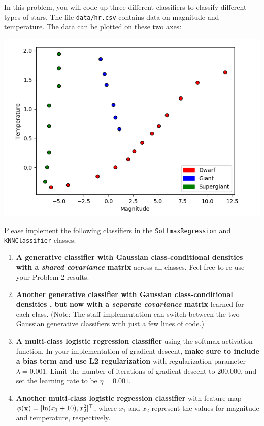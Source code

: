 \documentclass[submit]{harvardml}
\begin{document}
\begin{problem}
In this problem, you will code up three different classifiers to classify different types of stars. The file \verb|data/hr.csv| contains data on magnitude and temperature. The data can be plotted on these two axes:
\begin{center}
\includegraphics[width=.5\textwidth]{images/star.png}
\end{center}

Please implement the following classifiers in the \verb|SoftmaxRegression| and \verb|KNNClassifier| classes:

\begin{enumerate}[label=\alph*)]

\item \textbf{A generative classifier with Gaussian class-conditional
  densities with a \textit{shared covariance} matrix} across all classes. 
  Feel free to re-use your Problem 2 results.

\item \textbf{Another generative classifier with Gaussian class-conditional densities , but now 
with a \textit{separate covariance} matrix} learned for each class. (Note: 
The staff implementation can switch between the two Gaussian generative classifiers with just a
few lines of code.)

\item \textbf{A multi-class logistic regression classifier} using the softmax activation function. In your implementation of gradient descent, \textbf{make sure to include a bias term and use L2 regularization} with regularization parameter $\lambda = 0.001$. Limit the number of iterations of gradient descent to 200,000, and set the learning rate to be $\eta = 0.001$.

\item \textbf{Another multi-class logistic regression classifier} with feature map $\phi(\mathbf{x}) = [\ln (x_1 + 10), x_2^2]^\top$, where $x_1$ and $x_2$ represent the values for magnitude and temperature, respectively.


\end{enumerate}
\end{problem}
\end{document}
